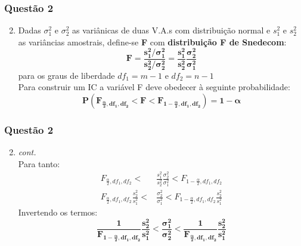 \documentclass{beamer}\usepackage[]{graphicx}\usepackage[]{color}
\begin{document}
    	\begin{frame}
    		\frametitle{Questão 2}
    		\begin{enumerate}
    			\setcounter{enumi}{1}
    			\item Dadas $\sigma_{1}^{2}$ e $\sigma_{2}^{2}$ as variânicas de duas V.A.s com distribuição normal e $s_{1}^2$ e $s_{2}^{2}$ as variâncias amostrais, define-se \textbf{F} com \textbf{distribuição F de Snedecom}:
    		$$\boldsymbol{F = \frac{s^{2}_{1}/\sigma_{1}^{2}}{s^{2}_{2}/\sigma_{2}^{2}} = \frac{s^{2}_{1}}{s^{2}_{2}} \frac{\sigma_{2}^{2}}{\sigma_{1}^{2}}}$$ 
    			para os graus de liberdade $df_{1} = m-1$ e $df_{2} = n-1$\\
    			Para construir um IC a variável F deve obedecer à seguinte probabilidade:
    			$$\boldsymbol{P(F_{\frac{\alpha}{2},df_{1},df_{2}} < F < F_{1-\frac{\alpha}{2},df_{1},df_{2}}) = 1 - \alpha}$$
    		\end{enumerate}	
    	\end{frame}
    
    	\begin{frame}
	    	\frametitle{Questão 2}
	    	\begin{enumerate}
	    		\setcounter{enumi}{1}
	    		\item \textit{cont.}\\
	    			Para tanto:
	    			\begin{align*}
		    			F_{\frac{\alpha}{2},df_{1},df_{2}} < &\frac{s^{2}_{1}}{s^{2}_{2}} \frac{\sigma_{2}^{2}}{\sigma_{1}^{2}} < F_{1-\frac{\alpha}{2},df_{1},df_{2}}\\   
		    			F_{\frac{\alpha}{2},df_{1},df_{2}} \frac{s^{2}_{2}}{s^{2}_{1}}< & \frac{\sigma_{2}^{2}}{\sigma_{1}^{2}} < F_{1-\frac{\alpha}{2},df_{1},df_{2}}\frac{s^{2}_{2}}{s^{2}_{1}}
	    			\end{align*}
	    			Invertendo os termos:$$\boldsymbol{\frac{1}{F_{1-\frac{\alpha}{2},df_{1},df_{2}}}\frac{s^{2}_{2}}{s^{2}_{1}} < \frac{\sigma_{1}^{2}}{\sigma_{2}^{2}} < \frac{1}{F_{\frac{\alpha}{2},df_{1},df_{2}}}\frac{s^{2}_{2}}{s^{2}_{1}}}$$
	    	\end{enumerate}	
    \end{frame}
	
\end{document}
